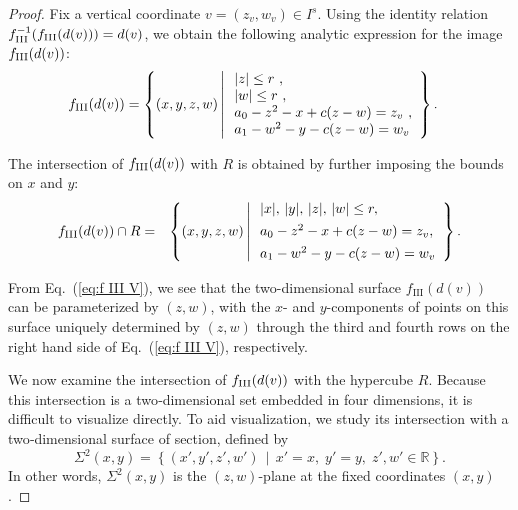 \documentclass[12pt]{iopart}
\begin{document}
\begin{proof}

Fix a vertical coordinate \( v = (z_v, w_v) \in I^s \). Using the identity relation \( f_{\rm III}^{-1}(f_{\rm III}(d(v))) = d(v) \), we obtain the following analytic expression for the image \( f_{\rm III}(d(v)) \):
\begin{eqnarray} 
 f_{\rm III}(d(v))&= 
\left\lbrace (x,y,z,w) \,\middle|\, \begin{array}{l}
|z| \leq r\ , \\
|w| \leq r\ , \\
a_0 - z^2 - x + c(z - w) = z_v\ , \\
a_1 - w^2 - y - c(z - w) = w_v
\end{array} \right\rbrace .\label{eq:f III V}
\end{eqnarray}

The intersection of \( f_{\rm III}(d(v)) \) with \( R \) is obtained by further imposing the bounds on \( x \) and \( y \):
\begin{eqnarray}
f_{\rm III}(d(v)) \cap R
&=&
\left\lbrace (x,y,z,w) \,\middle|\,
\begin{array}{l}
|x|,\,|y|,\,|z|,\,|w| \leq r, \\[4pt]
a_0 - z^{2} - x + c(z - w) = z_v, \\[4pt]
a_1 - w^{2} - y - c(z - w) = w_v
\end{array}
\right\rbrace .
\label{eq:f III V intersect R}
\end{eqnarray}

From Eq.~(\ref{eq:f III V}), we see that the two-dimensional surface \( f_{\mathrm{III}}(d(v)) \) can be parameterized by \((z,w)\), with the \(x\)- and \(y\)-components of points on this surface uniquely determined by \((z,w)\) through the third and fourth rows on the right hand side of Eq.~(\ref{eq:f III V}), respectively. 

We now examine the intersection of \( f_{\rm III}(d(v)) \) with the hypercube \( R \).  
Because this intersection is a two‑dimensional set embedded in four dimensions, it is difficult to visualize directly.  
To aid visualization, we study its intersection with a two‑dimensional surface of section, defined by  
\begin{equation}\label{eq: z w slice}
\Sigma^2(x,y) = \left\lbrace (x',y',z',w') \,\middle|\, x' = x,\; y' = y,\; z',w' \in \mathbb{R} \right\rbrace .
\end{equation}
In other words, \( \Sigma^2(x,y) \) is the \( (z,w) \)-plane at the fixed coordinates \( (x,y) \).


\end{proof}
\end{document}
